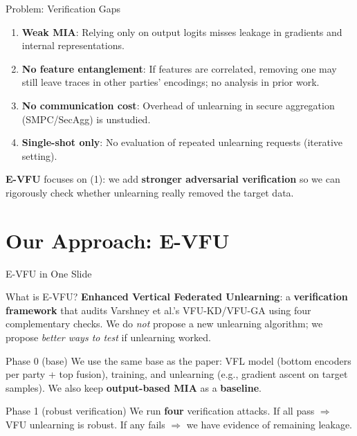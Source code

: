 \documentclass[11pt,aspectratio=169]{beamer}
\begin{document}
\begin{frame}{Problem: Verification Gaps}
  \begin{enumerate}
    \item \textbf{Weak MIA}: Relying only on output logits misses leakage in gradients and internal representations.
    \item \textbf{No feature entanglement}: If features are correlated, removing one may still leave traces in other parties' encodings; no analysis in prior work.
    \item \textbf{No communication cost}: Overhead of unlearning in secure aggregation (SMPC/SecAgg) is unstudied.
    \item \textbf{Single-shot only}: No evaluation of repeated unlearning requests (iterative setting).
  \end{enumerate}
  \vspace{0.5em}
  \textbf{E-VFU} focuses on (1): we add \textbf{stronger adversarial verification} so we can rigorously check whether unlearning really removed the target data.
\end{frame}

\section{Our Approach: E-VFU}

\begin{frame}{E-VFU in One Slide}
  \begin{block}{What is E-VFU?}
    \textbf{Enhanced Vertical Federated Unlearning}: a \textbf{verification framework} that audits Varshney et al.'s VFU-KD/VFU-GA using four complementary checks. We do \emph{not} propose a new unlearning algorithm; we propose \emph{better ways to test} if unlearning worked.
  \end{block}
  \vspace{0.5em}
  \begin{block}{Phase 0 (base)}
    We use the same base as the paper: VFL model (bottom encoders per party + top fusion), training, and unlearning (e.g., gradient ascent on target samples). We also keep \textbf{output-based MIA} as a \textbf{baseline}.
  \end{block}
  \vspace{0.5em}
  \begin{block}{Phase 1 (robust verification)}
    We run \textbf{four} verification attacks. If all pass $\Rightarrow$ VFU unlearning is robust. If any fails $\Rightarrow$ we have evidence of remaining leakage.
  \end{block}
\end{frame}
\end{document}

